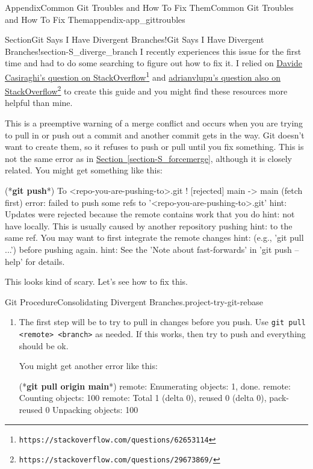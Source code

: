 \documentclass[oneside,10pt,]{book}
\newcommand{\xreffont}{\relax}
\newcommand{\mono}[1]{\texttt{#1}}
\newcommand{\consoleinput}[1]{\textbf{#1}}
\begin{document}
\begin{appendixptx}{Appendix}{Common Git Troubles and How To Fix Them}{}{Common Git Troubles and How To Fix Them}{}{}{appendix-app_gittroubles}
\begin{sectionptx}{Section}{Git Says I Have Divergent Branches!}{}{Git Says I Have Divergent Branches!}{}{}{section-S_diverge_branch}
I recently experiences this issue for the first time and had to do some searching to figure out how to fix it. I relied on \href{https://stackoverflow.com/questions/62653114}{Davide Casiraghi's question on StackOverflow}\footnote{\nolinkurl{https://stackoverflow.com/questions/62653114}\label{fn-S_diverge_branch-b-b}} and \href{https://stackoverflow.com/questions/29673869/}{adrianvlupu's question also on StackOverflow}\footnote{\nolinkurl{https://stackoverflow.com/questions/29673869/}\label{fn-S_diverge_branch-b-d}} to create this guide and you might find these resources more helpful than mine.%
\par
This is a preemptive warning of a merge conflict and occurs when you are trying to pull in or push out a commit and another commit gets in the way. Git doesn't want to create them, so it refuses to push or pull until you fix something. This is not the same error as in \hyperref[section-S_forcemerge]{Section~{\xreffont\ref{section-S_forcemerge}}}, although it is closely related. You might get something like this:%
\begin{console}{0}{1}{0}
(*\consoleinput{git push}*)
To <repo-you-are-pushing-to>.git
 ! [rejected]        main -> main (fetch first)
error: failed to push some refs to '<repo-you-are-pushing-to>.git'
hint: Updates were rejected because the remote contains work that you do
hint: not have locally. This is usually caused by another repository pushing
hint: to the same ref. You may want to first integrate the remote changes
hint: (e.g., 'git pull ...') before pushing again.
hint: See the 'Note about fast-forwards' in 'git push --help' for details.
\end{console}
This looks kind of scary. Let's see how to fix this.%
\begin{project}{Git Procedure}{Consolidating Divergent Branches.}{project-try-git-rebase}%
\begin{enumerate}[font=\bfseries,label=(\alph*),ref=\alph*]%
\item{}The first step will be to try to pull in changes before you push. Use \mono{git pull <remote> <branch>} as needed. If this works, then try to push and everything should be ok.%
\par
You might get another error like this:%
\begin{console}{0}{1}{0}
(*\consoleinput{git pull origin main}*)
remote: Enumerating objects: 1, done.
remote: Counting objects: 100%
remote: Total 1 (delta 0), reused 0 (delta 0), pack-reused 0
Unpacking objects: 100%

\end{console}
\end{enumerate}
\end{project}
\end{sectionptx}
\end{appendixptx}
\end{document}
